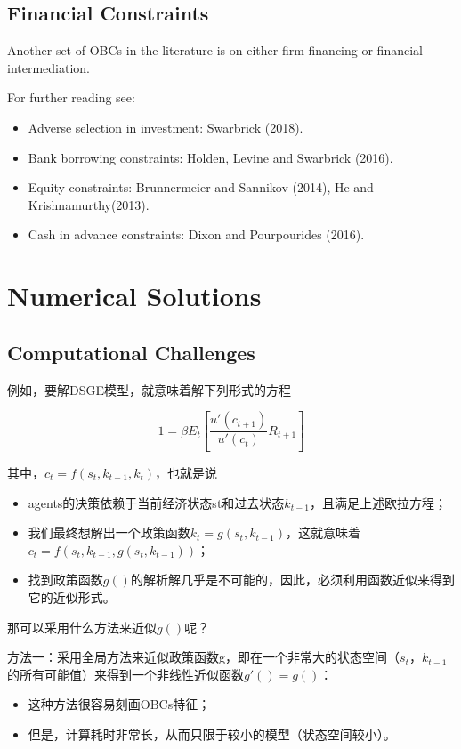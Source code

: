 \documentclass[cn,10pt,math=newtx,citestyle=gb7714-2015,bibstyle=gb7714-2015]{elegantbook}
\begin{document}
\subsection{Financial Constraints}

Another set of OBCs in the literature is on either firm financing or financial intermediation.

For further reading see:

\begin{itemize}
	\item Adverse selection in investment: Swarbrick (2018).
	\item Bank borrowing constraints: Holden, Levine and Swarbrick (2016).
	\item Equity constraints: Brunnermeier and Sannikov (2014), He and Krishnamurthy(2013).
	\item Cash in advance constraints: Dixon and Pourpourides (2016).
	
\end{itemize}

\section{Numerical Solutions}

\subsection{Computational Challenges}

例如，要解DSGE模型，就意味着解下列形式的方程

$$1=\beta E_t\left[\frac{u'(c_{t+1})}{u'(c_t)}R_{t+1}\right]$$

其中，$c_t=f(s_t,k_{t-1},k_t)$，也就是说
\begin{itemize}
	\item agents的决策依赖于当前经济状态st和过去状态$k_{t-1}$，且满足上述欧拉方程；
	
	\item 我们最终想解出一个政策函数$k_t=g(s_t,k_{t-1})$，这就意味着$c_t=f(s_t,k_{t-1},g(s_t,k_{t-1}))$；
	
	\item 找到政策函数$g()$的解析解几乎是不可能的，因此，必须利用函数近似来得到它的近似形式。
\end{itemize}

那可以采用什么方法来近似$g()$呢？

方法一：采用全局方法来近似政策函数g，即在一个非常大的状态空间（$s_t，k_{t-1}$的所有可能值）来得到一个非线性近似函数$g'()=g()$：
\begin{itemize}
	\item 这种方法很容易刻画OBCs特征；
	
	\item 但是，计算耗时非常长，从而只限于较小的模型（状态空间较小）。
\end{itemize}
\end{document}
